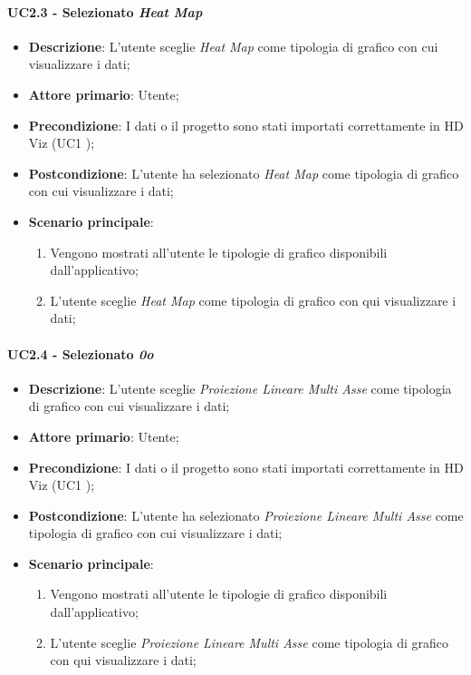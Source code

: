 \paragraph{UC2.3 - Selezionato \emph{Heat Map}}
\label{ssub:uc2.3}

	\begin{itemize}
		\item \textbf{Descrizione}: L'utente sceglie \emph{Heat Map} come tipologia di grafico con cui visualizzare i dati;
		\item \textbf{Attore primario}: Utente;
		\item \textbf{Precondizione}: I dati o il progetto sono stati importati correttamente in HD Viz (UC1 );
		\item \textbf{Postcondizione}: L'utente ha selezionato \emph{Heat Map} come tipologia di grafico con cui visualizzare i dati;
		\item \textbf{Scenario principale}:
			\begin{enumerate}
				\item Vengono mostrati all'utente le tipologie di grafico disponibili dall'applicativo;
				\item L'utente sceglie \emph{Heat Map} come tipologia di grafico con qui visualizzare i dati;
			\end{enumerate}
	\end{itemize}

\paragraph{UC2.4 - Selezionato \emph{0o}}
\label{ssub:uc2.4}

	\begin{itemize}
		\item \textbf{Descrizione}: L'utente sceglie \emph{Proiezione Lineare Multi Asse} come tipologia di grafico con cui visualizzare i dati;
		\item \textbf{Attore primario}: Utente;
		\item \textbf{Precondizione}: I dati o il progetto sono stati importati correttamente in HD Viz (UC1 );
		\item \textbf{Postcondizione}: L'utente ha selezionato \emph{Proiezione Lineare Multi Asse} come tipologia di grafico con cui visualizzare i dati;
		\item \textbf{Scenario principale}:
			\begin{enumerate}
				\item Vengono mostrati all'utente le tipologie di grafico disponibili dall'applicativo;
				\item L'utente sceglie \emph{Proiezione Lineare Multi Asse} come tipologia di grafico con qui visualizzare i dati;
			\end{enumerate}
	\end{itemize}